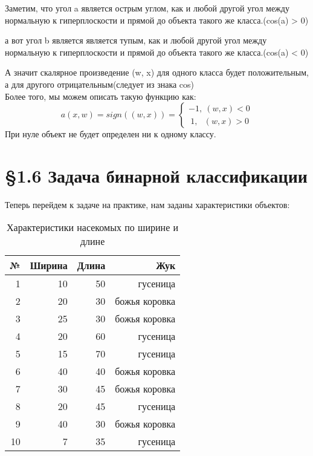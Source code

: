 Заметим, что угол a является \(\textbf{острым углом}\), как и любой другой угол между нормальную к гиперплоскости
и прямой до объекта такого же класса.(cos(a) > 0)\\
\vspace{0.3cm}

а вот угол b является является \(\textbf{тупым}\), как и любой другой угол между нормальную к гиперплоскости
и прямой до объекта такого же класса.(cos(a) < 0) \\
\vspace{0.3cm}

А значит скалярное произведение (w, x) для одного класса будет положительным,
а для другого отрицательным(следует из знака cos) \\
Более того, мы можем описать такую функцию как:
\[
    a(x, w) = sign((w, x)) = \begin{cases}
                                -1, \ (w, x) < 0 \\
                                \ 1,  \ \ \ (w, x) > 0
                                \end{cases}
\]
При нуле объект не будет определен ни к одному классу.




\newpage
\section*{\S 1.6 Задача бинарной классификации}
\vspace{0.8cm}
Теперь перейдем к задаче на практике, нам заданы характеристики объектов:
\vspace{0.5cm}

\begin{table}[H]
    \centering
    \begin{tabular}{rrrr}
        \toprule
        \textbf{№} & \textbf{Ширина} & \textbf{Длина} & \textbf{Жук} \\
        \midrule
        1  & 10 & 50 & гусеница \\
        2  & 20 & 30 & божья коровка \\
        3  & 25 & 30 & божья коровка \\
        4  & 20 & 60 & гусеница \\
        5  & 15 & 70 & гусеница \\
        6  & 40 & 40 & божья коровка \\
        7  & 30 & 45 & божья коровка \\
        8  & 20 & 45 & гусеница \\
        9  & 40 & 30 & божья коровка \\
        10 & 7  & 35 & гусеница \\
        \bottomrule
    \end{tabular}
    \caption{Характеристики насекомых по ширине и длине}
    \label{tab:bugs}
\end{table}

